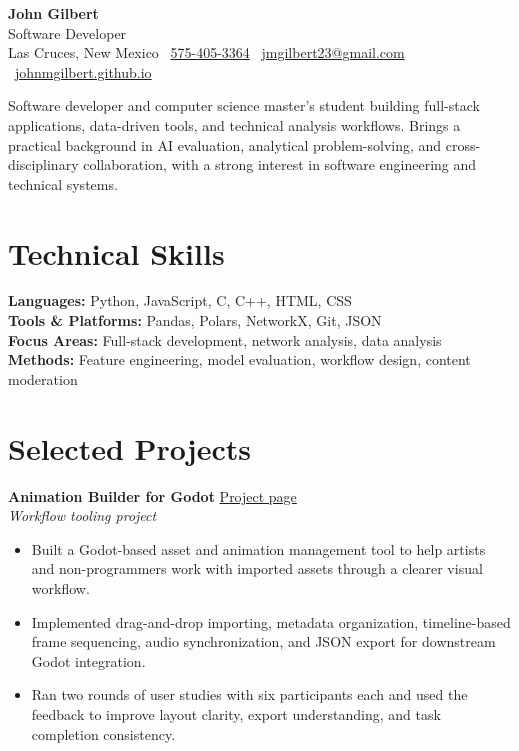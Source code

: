 \documentclass[11pt]{article}
\newcommand{\resumeentry}[4]{
  \textbf{#1} \hfill #2 \\
  \textit{#3}%
  \if\relax\detokenize{#4}\relax
  \else
    \hfill \textit{#4}%
  \fi
}
\begin{document}
\begin{center}
  {\LARGE \textbf{John Gilbert}} \\
  \vspace{0.2em}
  Software Developer \\
  \vspace{0.2em}
  Las Cruces, New Mexico \textbar\ 
  \href{tel:15754053364}{575-405-3364} \textbar\ 
  \href{mailto:jmgilbert23@gmail.com}{jmgilbert23@gmail.com} \textbar\ 
  \href{https://johnmgilbert.github.io}{johnmgilbert.github.io}
\end{center}

Software developer and computer science master's student building full-stack applications, data-driven tools, and technical analysis workflows. Brings a practical background in AI evaluation, analytical problem-solving, and cross-disciplinary collaboration, with a strong interest in software engineering and technical systems.

\section*{Technical Skills}
\textbf{Languages:} Python, JavaScript, C, C++, HTML, CSS \\
\textbf{Tools \& Platforms:} Pandas, Polars, NetworkX, Git, JSON \\
\textbf{Focus Areas:} Full-stack development, network analysis, data analysis \\
\textbf{Methods:} Feature engineering, model evaluation, workflow design, content moderation

\section*{Selected Projects}
\resumeentry{Animation Builder for Godot}{\href{https://johnmgilbert.github.io/pages/project/hcc.html}{Project page}}{Workflow tooling project}{}
\begin{itemize}
  \item Built a Godot-based asset and animation management tool to help artists and non-programmers work with imported assets through a clearer visual workflow.
  \item Implemented drag-and-drop importing, metadata organization, timeline-based frame sequencing, audio synchronization, and JSON export for downstream Godot integration.
  \item Ran two rounds of user studies with six participants each and used the feedback to improve layout clarity, export understanding, and task completion consistency.
\end{itemize}
\end{document}
